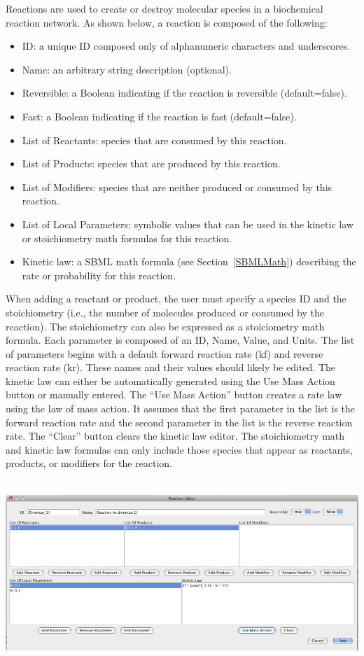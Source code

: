 \documentclass[titlepage,11pt]{article}
\begin{document}
\noindent
Reactions are used to create or destroy molecular species in a
biochemical reaction network.  As shown below, a 
reaction is composed of the following:
\begin{itemize}
\item ID: a unique ID composed only of alphanumeric characters and 
       underscores.
\item Name: an arbitrary string description (optional).
\item Reversible: a Boolean indicating if the reaction is reversible
       (default=false).
\item Fast: a Boolean indicating if the reaction is fast (default=false).
\item List of Reactants: species that are consumed by this reaction.
\item List of Products: species that are produced by this reaction.
\item List of Modifiers: species that are neither produced or consumed 
       by this reaction.
\item List of Local Parameters: symbolic values that can be used in
       the kinetic law or stoichiometry math formulas for this reaction.
\item Kinetic law: a SBML math formula (see Section~\ref{SBMLMath})
       describing the rate or probability for this reaction.
\end{itemize}
When adding a reactant or product, the user must specify a species ID and 
the stoichiometry (i.e., the number of molecules produced or consumed by the
reaction).  The stoichiometry can also be expressed as a stoiciometry math
formula.  Each parameter is composed of an ID, Name, Value, and Units.
The list of parameters begins with a default forward
reaction rate (kf) and reverse reaction rate (kr). These names
and their values should likely be edited. The kinetic law can
either be automatically generated using the Use Mass Action
button or manually entered.  The
``Use Mass Action'' button creates a rate law using the
law of mass action. It assumes that the first parameter in the
list is the forward reaction rate and the second parameter in the
list is the reverse reaction rate.  
The ``Clear'' button clears the kinetic law editor. 
The stoichiometry math and kinetic law formulas can only include
those species that appear as reactants, products, or modifiers for the reaction.
\begin{center}
\includegraphics[height=70mm]{screenshots/reaction}
\end{center}
\end{document}
